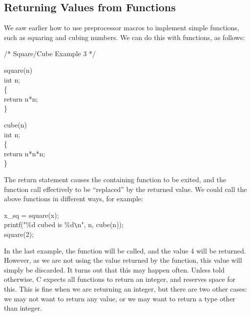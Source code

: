 \subsection{Returning Values from Functions}

     We saw  earlier how  to  use  preprocessor  macros  to  implement
simple functions, such as squaring and cubing numbers. We can do this
with functions, as follows:
\begin{code}   
 /* Square/Cube Example 3 */ \addVspace

 square(n) \\
 \> int n; \\
 \{ \\
 \> return n*n; \\
 \} \addVspace

 cube(n) \\
 \> int n; \\
 \{ \\
  \> return n*n*n; \\
 \} 
\end{code}
\noindent
     The {\cd return} statement causes 
the containing function to be
exited, and the function call effectively to be ``replaced''  by the 
returned value. We could call the above functions in different ways,
for example:
\begin{code}
 x\_sq = square(x); \\
 printf("\%d cubed is \%d\verb+\+n", n, cube(n)); \\
 square(2);
\end{code}
\noindent
     In the last example, the function will be called, and the value
4 will be returned. However,  as we  are not  using the  value
returned by the function, this value will simply be discarded.  It
turns  out that  this may  happen often.  Unless told otherwise, C
expects  all functions  to return an  integer, and  reserves space 
for this. This is  fine when  we are returning an integer, but there
are two other cases: we may not want to return any value, or we may
want to return a type other than integer.

